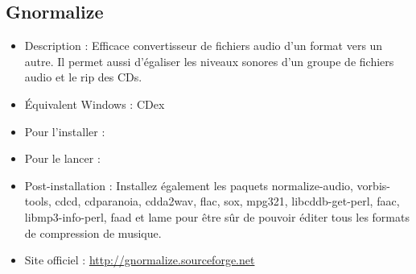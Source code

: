 \subsection{Gnormalize}
\begin{itemize}
\begingroup
{}
\item Description : Efficace convertisseur de fichiers audio d'un format vers un autre. Il permet aussi d'égaliser les niveaux sonores d'un groupe de fichiers audio et le rip des CDs.{\par}
\item Équivalent Windows : CDex{\par}
\endgroup
\item Pour l'installer : 
\item Pour le lancer : 
\item Post-installation : Installez également les paquets normalize-audio, vorbis-tools, cdcd, cdparanoia, cdda2wav, flac, sox, mpg321, libcddb-get-perl, faac, libmp3-info-perl, faad et lame pour être sûr de pouvoir éditer tous les formats de compression de musique.{\par}
\item Site officiel : \url{http://gnormalize.sourceforge.net}{\par}
\end{itemize}
